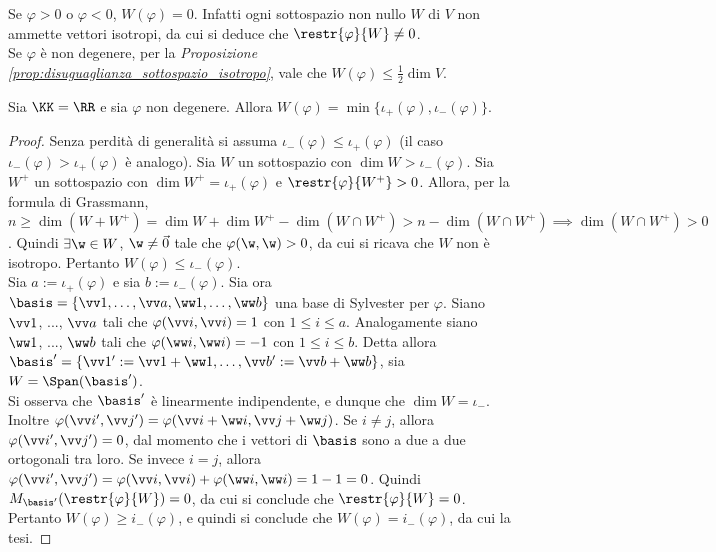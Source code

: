 \begin{remark}\nl
	\li Se $\varphi > 0$ o $\varphi < 0$, $W(\varphi) = 0$. Infatti ogni sottospazio non nullo $W$ di $V$
	non ammette vettori isotropi, da cui si deduce che $\restr{\varphi}{W} \neq 0$. \\
	\li Se $\varphi$ è non degenere, per la \textit{Proposizione \ref{prop:disuguaglianza_sottospazio_isotropo}}, vale che $W(\varphi) \leq \frac{1}{2} \dim V$.
\end{remark}

\begin{proposition}
	Sia $\KK = \RR$ e sia $\varphi$ non degenere. Allora
	$W(\varphi) = \min\{\iota_+(\varphi), \iota_-(\varphi)\}$.
\end{proposition}

\begin{proof}
	Senza perdità di generalità si assuma $\iota_-(\varphi) \leq \iota_+(\varphi)$ (il caso $\iota_-(\varphi) > \iota_+(\varphi)$ è analogo). Sia $W$ un sottospazio con $\dim W > \iota_-(\varphi)$. Sia $W^+$
	un sottospazio con $\dim W^+ = \iota_+(\varphi)$ e $\restr{\varphi}{W^+} > 0$. Allora, per la formula
	di Grassmann, $n \geq \dim (W + W^+) = \dim W + \dim W^+ - \dim (W \cap W^+) > n - \dim (W \cap W^+) \implies \dim (W \cap W^+) > 0$. Quindi $\exists \w \in W$, $\w \neq \vec 0$ tale che $\varphi(\w, \w) > 0$, da cui
	si ricava che $W$ non è isotropo. Pertanto $W(\varphi) \leq \iota_-(\varphi)$. \\
	
	Sia $a := \iota_+(\varphi)$ e sia $b := \iota_-(\varphi)$.
	Sia ora $\basis = \{ \vv 1, \ldots, \vv a, \ww 1, \ldots, \ww b \}$ una base di Sylvester per $\varphi$. Siano $\vv 1$, ..., $\vv a$ tali che $\varphi(\vv i, \vv i) = 1$
	con $1 \leq i \leq a$. Analogamente siano $\ww 1$, ..., $\ww b$ tali che $\varphi(\ww i, \ww i) = -1$ con
	$1 \leq i \leq b$. Detta allora $\basis' = \{ \vv 1 ' := \vv 1 + \ww 1, \ldots, \vv b ' := \vv b + \ww b \}$, sia $W = \Span(\basis')$. \\
	
	Si osserva che $\basis'$ è linearmente indipendente, e dunque che $\dim W = \iota_-$. Inoltre
	$\varphi(\vv i ', \vv j ') = \varphi(\vv i + \ww i, \vv j + \ww j)$. Se $i \neq j$, allora
	$\varphi(\vv i ', \vv j ') = 0$, dal momento che i vettori di $\basis$ sono a due a due ortogonali
	tra loro. Se invece $i = j$, allora $\varphi(\vv i ', \vv j ') = \varphi(\vv i, \vv i) + \varphi(\ww i, \ww i) = 1-1=0$. Quindi $M_{\basis'}(\restr{\varphi}{W}) = 0$, da cui si conclude che $\restr{\varphi}{W} = 0$.
	Pertanto $W(\varphi) \geq i_-(\varphi)$, e quindi si conclude che $W(\varphi) = i_-(\varphi)$, da cui la tesi.
\end{proof}